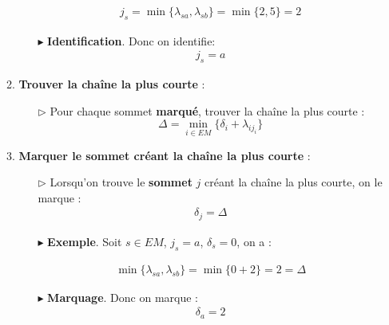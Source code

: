 \documentclass{report}
\begin{document}
\begin{multicols*}{2}
\begin{enumerate}
\begin{enumerate}
\begin{itemize}
        \begin{align*}
            j_s = \min\bigl\{\lambda_{sa}, \lambda_{sb} \bigr\} = 
            \min\bigl\{2, 5 \bigr\} = 2
        \end{align*}

    \item [$\blacktriangleright$ ] \textbf{Identification}. 
        Donc on identifie:
        \begin{align*}
            j_s = a
        \end{align*}
                \end{itemize}

            \item \textbf{Trouver la chaîne la plus courte} :
                \begin{itemize}
                    \item [$\rhd$ ] Pour chaque sommet \textbf{marqué}, trouver 
                        la chaîne la plus courte :
                        \[
                           \Delta = \min_{i\in EM}\bigl\{\delta_i + \lambda_{ij_i} \bigr\}
                        \]
            \end{itemize}
        \item \textbf{Marquer le sommet créant la chaîne la plus courte} :
        \begin{itemize}
            \item [$\rhd$ ] Lorsqu'on trouve le \textbf{sommet} $j$ 
                créant la chaîne la plus courte, on le marque :
                \begin{align*}
                    \delta_j = \Delta
                \end{align*}
    \item [$\blacktriangleright$ ] \textbf{Exemple}. Soit $s \in EM$, 
        $j_s = a$, $\delta_s = 0$, on a :

        \begin{align*}
            \min\bigl\{\lambda_{sa}, \lambda_{sb} \bigr\} = 
            \min\bigl\{0 + 2 \bigr\} = 2 = \Delta
        \end{align*}

    \item [$\blacktriangleright$ ] \textbf{Marquage}. 
        Donc on marque :
        \begin{align*}
            \delta_a  = 2
        \end{align*}

                \end{itemize}
        \end{enumerate}


\end{enumerate}
\end{multicols*}
\end{document}
